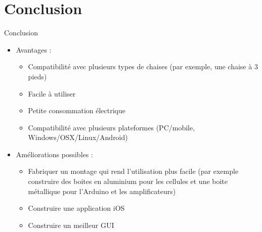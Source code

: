 \documentclass{beamer}
\begin{document}
\section{Conclusion}
\begin{frame}
\begin{block}{Conclusion}
\pause
\begin{itemize}
\item Avantages :
\pause
\begin{itemize}
\item Compatibilité avec plusieurs types de chaises (par exemple, une chaise à 3 pieds)
\pause
\item Facile à utiliser
\pause
\item Petite consommation électrique 
\pause
\item Compatibilité avec plusieurs plateformes (PC/mobile, Windows/OSX/Linux/Android)
\pause
\end{itemize}
\item Améliorations possibles :
\pause
\begin{itemize}
\item Fabriquer un montage qui rend l'utilisation plus facile (par exemple construire des boites en aluminium pour les cellules et une boite métallique pour l'Arduino et les amplificateurs)
\pause
\item Construire une application iOS
\pause
\item Construire un meilleur GUI
\end{itemize}
\end{itemize}
\end{block}
\end{frame}
\end{document}
